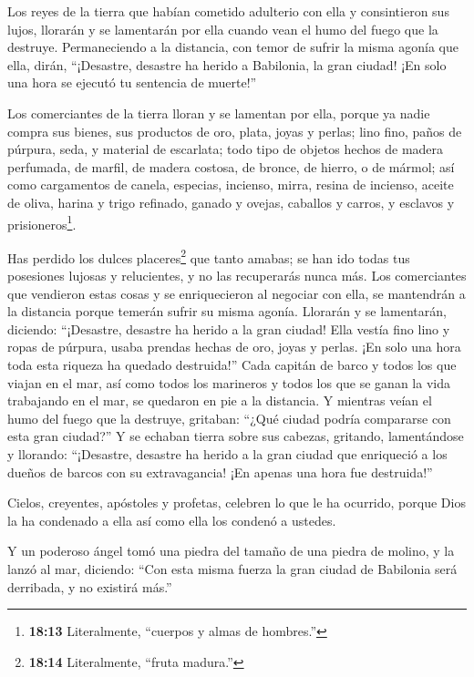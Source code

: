  Los reyes de la tierra que habían cometido adulterio con
ella y consintieron sus lujos, llorarán y se lamentarán por ella cuando
vean el humo del fuego que la destruye.  Permaneciendo a la
distancia, con temor de sufrir la misma agonía que ella, dirán,
``¡Desastre, desastre ha herido a Babilonia, la gran ciudad! ¡En solo
una hora se ejecutó tu sentencia de muerte!''

 Los comerciantes de la tierra lloran y se lamentan por
ella, porque ya nadie compra sus bienes,  sus productos de
oro, plata, joyas y perlas; lino fino, paños de púrpura, seda, y
material de escarlata; todo tipo de objetos hechos de madera perfumada,
de marfil, de madera costosa, de bronce, de hierro, o de mármol;
 así como cargamentos de canela, especias, incienso, mirra,
resina de incienso, aceite de oliva, harina y trigo refinado, ganado y
ovejas, caballos y carros, y esclavos y prisioneros\footnote{\textbf{18:13}
  Literalmente, ``cuerpos y almas de hombres.''}.

 Has perdido los dulces placeres\footnote{\textbf{18:14}
  Literalmente, ``fruta madura.''} que tanto amabas; se han ido todas
tus posesiones lujosas y relucientes, y no las recuperarás nunca más.
 Los comerciantes que vendieron estas cosas y se
enriquecieron al negociar con ella, se mantendrán a la distancia porque
temerán sufrir su misma agonía. Llorarán y se lamentarán, diciendo:
 ``¡Desastre, desastre ha herido a la gran ciudad! Ella
vestía fino lino y ropas de púrpura, usaba prendas hechas de oro, joyas
y perlas.  ¡En solo una hora toda esta riqueza ha quedado
destruida!'' Cada capitán de barco y todos los que viajan en el mar, así
como todos los marineros y todos los que se ganan la vida trabajando en
el mar, se quedaron en pie a la distancia.  Y mientras
veían el humo del fuego que la destruye, gritaban: ``¿Qué ciudad podría
compararse con esta gran ciudad?''  Y se echaban tierra
sobre sus cabezas, gritando, lamentándose y llorando: ``¡Desastre,
desastre ha herido a la gran ciudad que enriqueció a los dueños de
barcos con su extravagancia! ¡En apenas una hora fue destruida!''

 Cielos, creyentes, apóstoles y profetas, celebren lo que
le ha ocurrido, porque Dios la ha condenado a ella así como ella los
condenó a ustedes.

 Y un poderoso ángel tomó una piedra del tamaño de una
piedra de molino, y la lanzó al mar, diciendo: ``Con esta misma fuerza
la gran ciudad de Babilonia será derribada, y no existirá más.''

